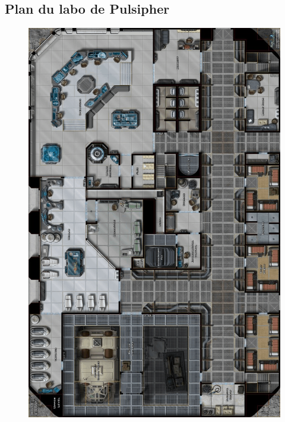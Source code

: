 \subsection{Plan du labo de Pulsipher}\label{sec:plan-labo-pulsipher}
\begin{figure}[!h]
    \centering
    \includegraphics[height=0.94\textheight]{_img/dos-au-muur/labo-pulsipher-map.png}
\end{figure}

\twocolumn